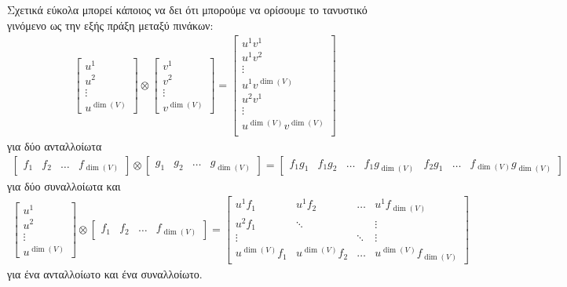 \documentclass[main.tex]{subfiles}
\begin{document}
 	Σχετικά εύκολα μπορεί κάποιος να δει ότι μπορούμε να ορίσουμε το τανυστικό γινόμενο ως την εξής πράξη μεταξύ πινάκων:
 	\begin{align*}
 		\begin{bmatrix}
 			u^1 \\
 			u^2 \\
 			\vdots\\
 			u^{\dim(V)}
 		\end{bmatrix} \otimes 
 		\begin{bmatrix}
 			v^1 \\
 			v^2 \\
 			\vdots\\
 			v^{\dim(V)}
 		\end{bmatrix} =
 		\begin{bmatrix}
 			u^1v^1 \\
 			u^1v^2 \\
 			\vdots\\
 			u^1v^{\dim(V)}\\
 			u^2v^1\\
 			\vdots \\
 			u^{\dim(V)}v^{\dim(V)}\\
 		\end{bmatrix}
	\end{align*}
	για δύο ανταλλοίωτα
	\begin{align*}
		\begin{bmatrix}
			f_1 & f_2 & \ldots & f_{\dim(V)} 
		\end{bmatrix} \otimes 
		\begin{bmatrix}
			g_1 & g_2 & \ldots & g_{\dim(V)} 
		\end{bmatrix} =
		\begin{bmatrix}
			f_1g_1 & f_1g_2 & \ldots & f_1g_{\dim(V)} & f_2g_1 & \ldots & f_{\dim(V)}g_{\dim(V)} 
		\end{bmatrix} 
	\end{align*}
	για δύο συναλλοίωτα και
	\begin{align*}
		\begin{bmatrix}
			u^1 \\
			u^2 \\
			\vdots\\
			u^{\dim(V)}
		\end{bmatrix} \otimes 
		\begin{bmatrix}
			f_1 & f_2 & \ldots & f_{\dim(V)} 
		\end{bmatrix} =
		\begin{bmatrix}
			u^1f_1 & u^1f_2 & \ldots & u^1f_{\dim(V)} \\
			u^2f_1 & \ddots & & \vdots\\
			\vdots & & \ddots & \vdots \\
			u^{\dim(V)}f_1 & u^{\dim(V)}f_2 & \ldots & u^{\dim(V)}f_{\dim(V)}
		\end{bmatrix}
	\end{align*}
	για ένα ανταλλοίωτο και ένα συναλλοίωτο.
	
\end{document}
